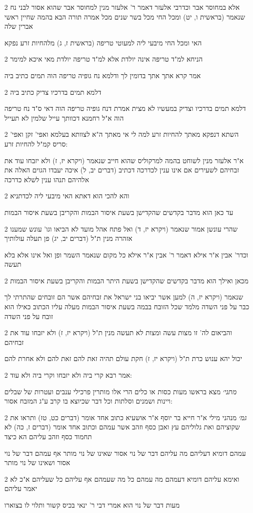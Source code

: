\documentclass[12pt, openany]{book}
\newcommand{\sethebfont}{
\fontsize{10.5pt}{21.0pt} \selectfont
}
\newcommand{\twocol}[1]{
	{\sethebfont \begin{multicols}{2}
			#1
	\end{multicols}}	
}
\begin{document}
\twocol{אלא במחוסר אבר וכדרבי אלעזר דאמר ר' אלעזר מנין למחוסר אבר שהוא אסור לבני נח שנאמר (בראשית ו, יט) ומכל החי מכל בשר שנים מכל אמרה תורה הבא בהמה שחיין ראשי אברין שלה
\par האי ומכל החי מיבעי ליה למעוטי טריפה (בראשית ז, ג) מלהחיות זרע נפקא}
\twocol{הניחא למ"ד טריפה אינה יולדת אלא למ"ד טריפה יולדת מאי איכא למימר
\par אמר קרא אתך אתך בדומין לך ודלמא נח גופיה טריפה הוה תמים כתיב ביה}
\twocol{דלמא תמים בדרכיו צדיק כתיב ביה
\par דלמא תמים בדרכיו וצדיק במעשיו לא מצית אמרת דנח גופיה טריפה הוה דאי ס"ד נח טריפה הוה א"ל רחמנא דכוותך עייל שלמין לא תעייל}
\twocol{השתא דנפקא מאתך להחיות זרע למה לי אי מאתך ה"א לצוותא בעלמא ואפי' זקן ואפי' סריס קמ"ל להחיות זרע:
\par א"ר אלעזר מנין לשוחט בהמה למרקוליס שהוא חייב שנאמר (ויקרא יז, ז) ולא יזבחו עוד את זבחיהם לשעירים אם אינו ענין לכדרכה דכתיב (דברים יב, ל) איכה יעבדו הגוים האלה את אלהיהם תנהו ענין לשלא כדרכה}
\twocol{והא להכי הוא דאתא האי מיבעי ליה לכדתניא
\par עד כאן הוא מדבר בקדשים שהקדישן בשעת איסור הבמות והקריבן בשעת איסור הבמות}
\twocol{שהרי עונשן אמור שנאמר (ויקרא יז, ד) ואל פתח אהל מועד לא הביאו וגו' עונש שמענו אזהרה מנין ת"ל (דברים יב, יג) פן תעלה עולותיך
\par וכדר' אבין א"ר אילא דאמר ר' אבין א"ר אילא כל מקום שנאמר השמר ופן ואל אינו אלא בלא תעשה}
\twocol{מכאן ואילך הוא מדבר בקדשים שהקדישן בשעת היתר הבמות והקריבן בשעת איסור הבמות
\par שנאמר (ויקרא יז, ה) למען אשר יביאו בני ישראל את זבחיהם אשר הם זובחים שהתרתי לך כבר על פני השדה מלמד שכל הזובח בבמה בשעת איסור הבמות מעלה עליו הכתוב כאילו הוא זובח על פני השדה}
\twocol{והביאום לה' זו מצות עשה ומצות לא תעשה מנין ת"ל (ויקרא יז, ז) ולא יזבחו עוד את זבחיהם
\par יכול יהא ענוש כרת ת"ל (ויקרא יז, ז) חקת עולם תהיה זאת להם זאת להם ולא אחרת להם}
\twocol{אמר רבא קרי ביה ולא יזבחו וקרי ביה ולא עוד:
\par {\large\emph{מתני׳}} מצא בראשו מעות כסות או כלים הרי אלו מותרין פרכילי ענבים ועטרות של שבלים ויינות ושמנים וסלתות וכל דבר שכיוצא בו קרב ע"ג המזבח אסור:}
\twocol{{\large\emph{גמ׳}} מנהני מילי א"ר חייא בר יוסף א"ר אושעיא כתוב אחד אומר (דברים כט, טז) ותראו את שקוציהם ואת גלוליהם עץ ואבן כסף וזהב אשר עמהם וכתוב אחד אומר (דברים ז, כה) לא תחמוד כסף וזהב עליהם הא כיצד
\par עמהם דומיא דעליהם מה עליהם דבר של נוי אסור שאינו של נוי מותר אף עמהם דבר של נוי אסור ושאינו של נוי מותר}
\twocol{ואימא עליהם דומיא דעמהם מה עמהם כל מה שעמהם אף עליהם כל שעליהם א"כ לא יאמר עליהם
\par מעות דבר של נוי הוא אמרי דבי ר' ינאי בכיס קשור ותלוי לו בצוארו}
\end{document}
